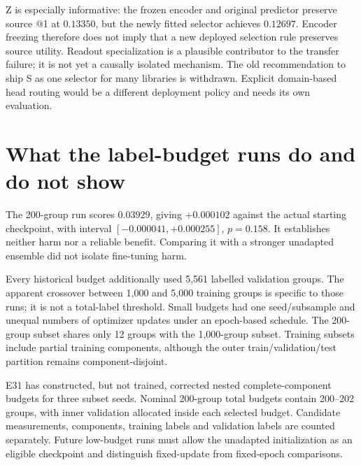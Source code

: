 \documentclass[11pt]{article}
\begin{document}
Z is especially informative: the frozen encoder and original predictor preserve source
@1 at $0.13350$, but the newly fitted selector achieves $0.12697$. Encoder freezing therefore
does not imply that a new deployed selection rule preserves source utility. Readout
specialization is a plausible contributor to the transfer failure; it is not yet a
causally isolated mechanism. The old recommendation to ship S as one selector for many
libraries is withdrawn. Explicit domain-based head routing would be a different deployment
policy and needs its own evaluation.

\section{What the label-budget runs do and do not show}

The 200-group run scores $0.03929$, giving $+0.000102$ against the actual starting checkpoint,
with interval $[-0.000041,+0.000255]$, $p=0.158$. It establishes neither harm nor a reliable
benefit. Comparing it with a stronger unadapted ensemble did not isolate fine-tuning harm.

Every historical budget additionally used 5,561 labelled validation groups. The apparent
crossover between 1,000 and 5,000 training groups is specific to those runs; it is not a
total-label threshold. Small budgets had one seed/subsample and unequal numbers of optimizer
updates under an epoch-based schedule. The 200-group subset shares only 12 groups with the
1,000-group subset. Training subsets include partial training components, although the outer
train/validation/test partition remains component-disjoint.

E31 has constructed, but not trained, corrected nested complete-component budgets for three
subset seeds. Nominal 200-group total budgets contain 200--202 groups, with inner validation
allocated inside each selected budget. Candidate measurements, components, training labels
and validation labels are counted separately. Future low-budget runs must allow the
unadapted initialization as an eligible checkpoint and distinguish fixed-update from
fixed-epoch comparisons.
\end{document}
